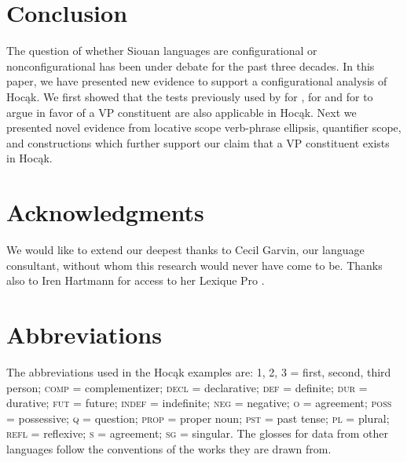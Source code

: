 \documentclass[output=paper]{LSP/langsci}
\begin{document}
\section{Conclusion}\label{sec:jrs:5}
 
The question of whether Siouan languages are configurational or nonconfigurational has been under debate for the past three decades. In this paper, we have presented new evidence to support a configurational analysis of Hocąk.  We first showed that the tests previously used by \citet{Boyle2007} for , \citet{Graczyk1991a} for  and \citet{West2003} for  to argue in favor of a VP constituent are also applicable in Hocąk.  Next we presented novel evidence from locative scope verb-phrase ellipsis, quantifier scope, and  constructions which further support our claim that a VP constituent exists in Hocąk. 
 

\section*{Acknowledgments}
We would like to extend our deepest thanks to Cecil Garvin, our language consultant, without whom this research would never have come to be. Thanks also to Iren Hartmann for access to her Lexique Pro .

\section*{Abbreviations}
 
The abbreviations used in the Hocąk examples are: 1, 2, 3 = first, second, third person; \textsc{comp} = complementizer; \textsc{decl} = declarative; \textsc{def} = definite; \textsc{dur} = durative; \textsc{fut} = future; \textsc{indef} = indefinite; \textsc{neg} = negative; \textsc{o} =  agreement; \textsc{poss} = possessive; \textsc{q} = question; \textsc{prop} = proper noun; \textsc{pst} = past tense; \textsc{pl} = plural; \textsc{refl} = reflexive; \textsc{s} =  agreement; \textsc{sg} = singular. The glosses for data from other languages follow the conventions of the works they are drawn from.
 
 
 

\printbibliography[heading=subbibliography,notkeyword=this]
\end{document}
